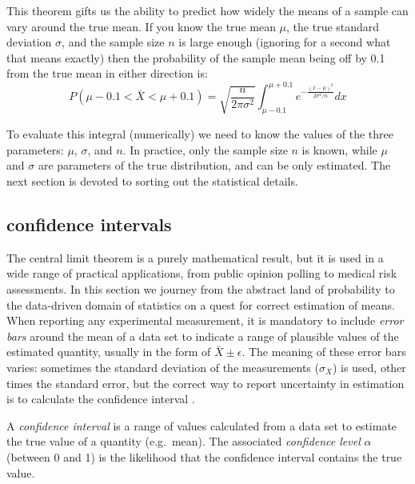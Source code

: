 \documentclass[
  letterpaper,
  DIV=11,
  numbers=noendperiod]{scrreprt}
\begin{document}
This theorem gifts us the ability to predict how widely the means of a
sample can vary around the true mean. If you know the true mean \(\mu\),
the true standard deviation \(\sigma\), and the sample size \(n\) is
large enough (ignoring for a second what that means exactly) then the
probability of the sample mean being off by 0.1 from the true mean in
either direction is:
\[ P(\mu-0.1< \bar X < \mu+0.1) = \sqrt{\frac{n}{2\pi \sigma^2}} \int_{\mu-0.1} ^{\mu+0.1} e^{-\frac{(x-\mu)^2}{2 \sigma^2/n}}dx\]

To evaluate this integral (numerically) we need to know the values of
the three parameters: \(\mu\), \(\sigma\), and \(n\). In practice, only
the sample size \(n\) is known, while \(\mu\) and \(\sigma\) are
parameters of the true distribution, and can be only estimated. The next
section is devoted to sorting out the statistical details.

\hypertarget{confidence-intervals}{%
\subsection{confidence intervals}\label{confidence-intervals}}

The central limit theorem is a purely mathematical result, but it is
used in a wide range of practical applications, from public opinion
polling to medical risk assessments. In this section we journey from the
abstract land of probability to the data-driven domain of statistics on
a quest for correct estimation of means. When reporting any experimental
measurement, it is mandatory to include \emph{error bars} around the
mean of a data set to indicate a range of plausible values of the
estimated quantity, usually in the form of \(\bar X \pm \epsilon\). The
meaning of these error bars varies: sometimes the standard deviation of
the measurements (\(\sigma_X\)) is used, other times the standard error,
but the correct way to report uncertainty in estimation is to calculate
the confidence interval \cite{whitlock_analysis_2008}.

\begin{tcolorbox}[enhanced jigsaw, coltitle=black, arc=.35mm, opacitybacktitle=0.6, breakable, bottomtitle=1mm, toptitle=1mm, titlerule=0mm, colback=white, leftrule=.75mm, rightrule=.15mm, colframe=quarto-callout-note-color-frame, colbacktitle=quarto-callout-note-color!10!white, opacityback=0, title=\textcolor{quarto-callout-note-color}{\faInfo}\hspace{0.5em}{Definition}, left=2mm, toprule=.15mm, bottomrule=.15mm]

A \emph{confidence interval} is a range of values calculated from a data
set to estimate the true value of a quantity (e.g.~mean). The associated
\emph{confidence level} \(\alpha\) (between 0 and 1) is the likelihood
that the confidence interval contains the true value.

\end{tcolorbox}
\end{document}

